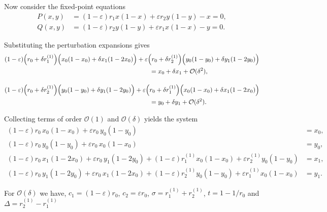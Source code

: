Now consider the fixed-point equations
\begin{align}
P(x,y) &= (1-\varepsilon)r_1 x(1-x)+\varepsilon r_2 y(1-y)-x = 0,\\
Q(x,y) &= (1-\varepsilon)r_2 y(1-y)+\varepsilon r_1 x(1-x)-y = 0.
\end{align}

Substituting the perturbation expansions gives
\begin{align*}
&(1-\varepsilon)\Bigl(r_0+\delta r_1^{(1)}\Bigr)
\Bigl(x_0(1-x_0)+\delta x_1(1-2x_0)\Bigr)
+\varepsilon\Bigl(r_0+\delta r_2^{(1)}\Bigr)
\Bigl(y_0(1-y_0)+\delta y_1(1-2y_0)\Bigr)
\notag\\
&\hspace{8cm}=
x_0+\delta x_1+\mathcal O(\delta^2),
\\[1em]
&(1-\varepsilon)\Bigl(r_0+\delta r_2^{(1)}\Bigr)
\Bigl(y_0(1-y_0)+\delta y_1(1-2y_0)\Bigr)
+\varepsilon\Bigl(r_0+\delta r_1^{(1)}\Bigr)
\Bigl(x_0(1-x_0)+\delta x_1(1-2x_0)\Bigr)
\notag\\
&\hspace{8cm}=
y_0+\delta y_1+\mathcal O(\delta^2).
\end{align*}

Collecting terms of order $\mathcal O(1)$ and $\mathcal O(\delta)$ yields the system
\begin{align*}
(1-\varepsilon)r_0\,x_0(1-x_0)+\varepsilon r_0\,y_0(1-y_0) &= x_0, \\
(1-\varepsilon)r_0\,y_0(1-y_0)+\varepsilon r_0\,x_0(1-x_0) &= y_0, \\
(1-\varepsilon)r_0\,x_1(1-2x_0)+\varepsilon r_0\,y_1(1-2y_0)
+(1-\varepsilon)r_1^{(1)}x_0(1-x_0)+\varepsilon r_2^{(1)}y_0(1-y_0) &= x_1, \\
(1-\varepsilon)r_0\,y_1(1-2y_0)+\varepsilon r_0\,x_1(1-2x_0)
+(1-\varepsilon)r_2^{(1)}y_0(1-y_0)+\varepsilon r_1^{(1)}x_0(1-x_0) &= y_1.
\end{align*}

For $\mathcal{O}(\delta)$ we have, $c_1 = (1-\varepsilon)r_0$, $c_2 = \varepsilon r_0$, $\sigma = r_1^{(1)}+r_2^{(1)}$, $t = 1 - 1/r_0$ and $\Delta = r_2^{(1)}- r_1^{(1)}$

